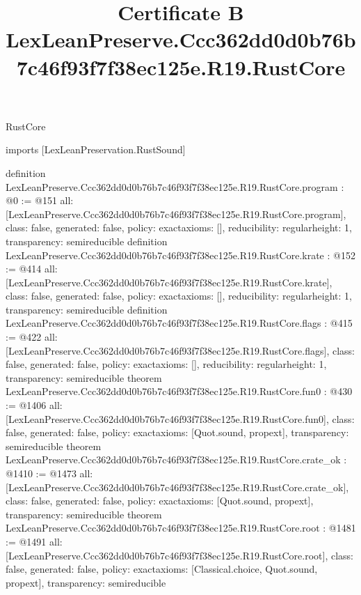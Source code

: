 \begin{lexlean}{RustCore}
\title{Certificate B LexLeanPreserve.Ccc362dd0d0b76b7c46f93f7f38ec125e.R19.RustCore}
\begin{coremodule}
imports [LexLeanPreservation.RustSound]

definition LexLeanPreserve.Ccc362dd0d0b76b7c46f93f7f38ec125e.R19.RustCore.program : @0 := @151 {
  all: [LexLeanPreserve.Ccc362dd0d0b76b7c46f93f7f38ec125e.R19.RustCore.program],
  class: false,
  generated: false,
  policy: exact{axioms: []},
  reducibility: regular{height: 1},
  transparency: semireducible
}
definition LexLeanPreserve.Ccc362dd0d0b76b7c46f93f7f38ec125e.R19.RustCore.krate : @152 := @414 {
  all: [LexLeanPreserve.Ccc362dd0d0b76b7c46f93f7f38ec125e.R19.RustCore.krate],
  class: false,
  generated: false,
  policy: exact{axioms: []},
  reducibility: regular{height: 1},
  transparency: semireducible
}
definition LexLeanPreserve.Ccc362dd0d0b76b7c46f93f7f38ec125e.R19.RustCore.flags : @415 := @422 {
  all: [LexLeanPreserve.Ccc362dd0d0b76b7c46f93f7f38ec125e.R19.RustCore.flags],
  class: false,
  generated: false,
  policy: exact{axioms: []},
  reducibility: regular{height: 1},
  transparency: semireducible
}
theorem LexLeanPreserve.Ccc362dd0d0b76b7c46f93f7f38ec125e.R19.RustCore.fun0 : @430 := @1406 {
  all: [LexLeanPreserve.Ccc362dd0d0b76b7c46f93f7f38ec125e.R19.RustCore.fun0],
  class: false,
  generated: false,
  policy: exact{axioms: [Quot.sound, propext]},
  transparency: semireducible
}
theorem LexLeanPreserve.Ccc362dd0d0b76b7c46f93f7f38ec125e.R19.RustCore.crate_ok : @1410 := @1473 {
  all: [LexLeanPreserve.Ccc362dd0d0b76b7c46f93f7f38ec125e.R19.RustCore.crate_ok],
  class: false,
  generated: false,
  policy: exact{axioms: [Quot.sound, propext]},
  transparency: semireducible
}
theorem LexLeanPreserve.Ccc362dd0d0b76b7c46f93f7f38ec125e.R19.RustCore.root : @1481 := @1491 {
  all: [LexLeanPreserve.Ccc362dd0d0b76b7c46f93f7f38ec125e.R19.RustCore.root],
  class: false,
  generated: false,
  policy: exact{axioms: [Classical.choice, Quot.sound, propext]},
  transparency: semireducible
}


\end{coremodule}
\end{lexlean}
